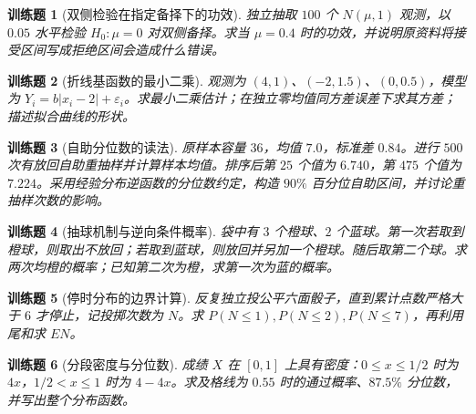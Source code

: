 \documentclass[UTF8,12pt,a4paper,fontset=fandol]{ctexbook}
\newtheorem{exercise}{训练题}[section]
\begin{document}
\begin{exercise}[双侧检验在指定备择下的功效]\label{q:M-F-11}
独立抽取 $100$ 个 $N(\mu,1)$ 观测，以 $0.05$ 水平检验 $H_0:\mu=0$ 对双侧备择。求当 $\mu=0.4$ 时的功效，并说明原资料将接受区间写成拒绝区间会造成什么错误。\par{}\end{exercise}

\begin{exercise}[折线基函数的最小二乘]\label{q:M-F-12}
观测为 $(4,1)$、$(-2,1.5)$、$(0,0.5)$，模型为 $Y_i=b|x_i-2|+\varepsilon_i$。求最小二乘估计；在独立零均值同方差误差下求其方差；描述拟合曲线的形状。\par{}\end{exercise}

\begin{exercise}[自助分位数的读法]\label{q:M-F-13}
原样本容量 $36$，均值 $7.0$，标准差 $0.84$。进行 $500$ 次有放回自助重抽样并计算样本均值。排序后第 $25$ 个值为 $6.740$，第 $475$ 个值为 $7.224$。采用经验分布逆函数的分位数约定，构造 $90\%$ 百分位自助区间，并讨论重抽样次数的影响。\par{}\end{exercise}

\begin{exercise}[抽球机制与逆向条件概率]\label{q:M-PF-18}
袋中有 $3$ 个橙球、$2$ 个蓝球。第一次若取到橙球，则取出不放回；若取到蓝球，则放回并另加一个橙球。随后取第二个球。求两次均橙的概率；已知第二次为橙，求第一次为蓝的概率。\par{}\end{exercise}

\begin{exercise}[停时分布的边界计算]\label{q:M-PF-19}
反复独立投公平六面骰子，直到累计点数严格大于 $6$ 才停止，记投掷次数为 $N$。求 $P(N\le1),P(N\le2),P(N\le7)$，再利用尾和求 $EN$。\par{}\end{exercise}

\begin{exercise}[分段密度与分位数]\label{q:M-PF-20}
成绩 $X$ 在 $[0,1]$ 上具有密度：$0\le x\le1/2$ 时为 $4x$，$1/2<x\le1$ 时为 $4-4x$。求及格线为 $0.55$ 时的通过概率、$87.5\%$ 分位数，并写出整个分布函数。\par{}\end{exercise}
\end{document}
